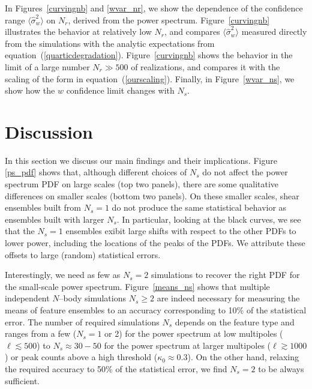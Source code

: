\documentclass[reprint,aps,prd,superscriptaddress,showkeys,showpacs]{revtex4-1}
\newcommand{\h}[1]{\hat{#1}}
\begin{document}
In Figures~\ref{curvingnb} and \ref{wvar_nr}, we show the dependence
of the confidence range $\langle\h{\sigma}^2_w\rangle$ on $N_r$,
derived from the power spectrum.
Figure~\ref{curvingnb} illustrates the behavior at relatively low
$N_r$, and compares $\langle\h{\sigma}^2_w\rangle$ measured directly
from the simulations with the analytic expectations from
equation~(\ref{quarticdegradation}).  Figure~\ref{curvingnb} shows the
behavior in the limit of a large number $N_r\gg500$ of realizations,
and compares it with the scaling of the form in
equation~(\ref{ourscaling}). Finally, in Figure~\ref{wvar_ns}, we show
how the $w$ confidence limit changes with $N_s$.


\section{Discussion}

In this section we discuss our main findings and their
implications. Figure \ref{ps_pdf} shows that, although different
choices of $N_s$ do not affect the power spectrum PDF on large scales
(top two panels), there are some qualitative differences on smaller
scales (bottom two panels). On these smaller scales, shear ensembles
built from $N_s=1$ do not produce the same statistical behavior as
ensembles built with larger $N_s$. In particular, looking at the
black curves, we see that the $N_s=1$ ensembles exibit large shifts
with respect to the other PDFs to lower power, including the locations
of the peaks of the PDFs.  We attribute these offsets to large
(random) statistical errors.

Interestingly, we need as few as $N_s=2$ simulations to recover the
right PDF
for the small-scale power spectrum.  Figure~\ref{means_ns} shows that
multiple independent $N$--body simulations $N_s\geq2$ are indeed
necessary for measuring the means of feature ensembles to an accuracy
corresponding to 10\% of the statistical error. The number of required
simulations $N_s$ depends on the feature type and ranges from a few ($N_s=1$
or 2) for the power spectrum at low multipoles ($\ell\lesssim 500$) to
$N_s\approx 30-50$ for the power spectrum at larger
multipoles ($\ell\gtrsim1000$) or peak counts above a high threshold
($\kappa_0\approx0.3$).
On the other hand, relaxing the required accuracy to 50\% of the statistical
error, we find $N_s=2$ to be always sufficient.
\end{document}
